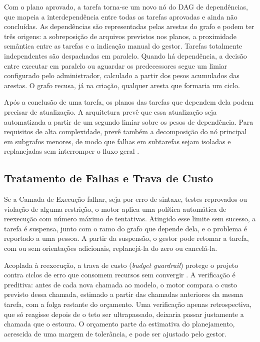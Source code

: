 Com o plano aprovado, a tarefa torna-se um novo nó do DAG de dependências, que mapeia a interdependência entre todas as tarefas aprovadas e ainda não concluídas. As dependências são representadas pelas arestas do grafo e podem ter três origens: a sobreposição de arquivos previstos nos planos, a proximidade semântica entre as tarefas e a indicação manual do gestor. Tarefas totalmente independentes são despachadas em paralelo. Quando há dependência, a decisão entre executar em paralelo ou aguardar os predecessores segue um limiar configurado pelo administrador, calculado a partir dos pesos acumulados das arestas. O grafo recusa, já na criação, qualquer aresta que formaria um ciclo.

Após a conclusão de uma tarefa, os planos das tarefas que dependem dela podem precisar de atualização. A arquitetura prevê que essa atualização seja automatizada a partir de um segundo limiar sobre os pesos de dependência. Para requisitos de alta complexidade, prevê também a decomposição do nó principal em subgrafos menores, de modo que falhas em subtarefas sejam isoladas e replanejadas sem interromper o fluxo geral \cite{kim2026scaling}.

\subsection{Tratamento de Falhas e Trava de Custo}\label{sec:4.4.3}

Se a Camada de Execução falhar, seja por erro de sintaxe, testes reprovados ou violação de alguma restrição, o motor aplica uma política automática de reexecução com número máximo de tentativas. Atingido esse limite sem sucesso, a tarefa é suspensa, junto com o ramo do grafo que depende dela, e o problema é reportado a uma pessoa. A partir da suspensão, o gestor pode retomar a tarefa, com ou sem orientações adicionais, replanejá-la do zero ou cancelá-la.

Acoplada à reexecução, a trava de custo (\textit{budget guardrail}) protege o projeto contra ciclos de erro que consomem recursos sem convergir \cite{spark2026cio}. A verificação é preditiva: antes de cada nova chamada ao modelo, o motor compara o custo previsto dessa chamada, estimado a partir das chamadas anteriores da mesma tarefa, com a folga restante do orçamento. Uma verificação apenas retrospectiva, que só reagisse depois de o teto ser ultrapassado, deixaria passar justamente a chamada que o estoura. O orçamento parte da estimativa do planejamento, acrescida de uma margem de tolerância, e pode ser ajustado pelo gestor.

